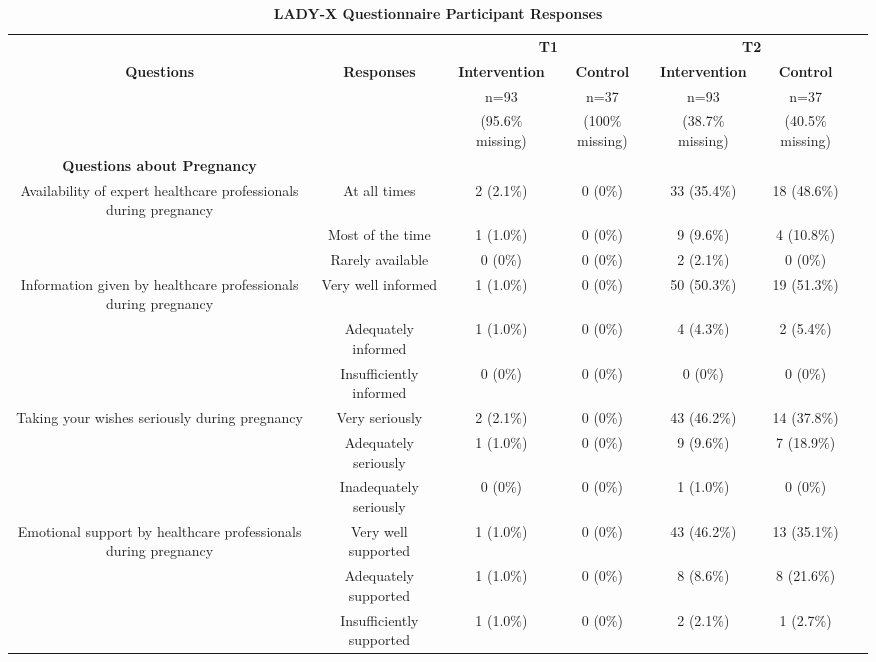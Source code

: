 \documentclass[12pt]{article}
\begin{document}
\begin{landscape}
\centering
\begin{table}[htbp]
    \centering
    \captionsetup{justification=raggedright, singlelinecheck=false, skip=0pt, labelfont=bf}
    \caption{\textbf{LADY-X Questionnaire Participant Responses}}
    \begin{threeparttable}
        \small
        \begin{tabular}{ccccccc}
            \toprule
            & & \multicolumn{2}{c}{\textbf{T1}} & \multicolumn{2}{c}{\textbf{T2}} \\
            \textbf{Questions} & \textbf{Responses} & \textbf{Intervention} & \textbf{Control} & \textbf{Intervention} & \textbf{Control} \\
            & & n=93 & n=37 & n=93 & n=37 \\
            & & (95.6\% missing) & (100\% missing) & (38.7\% missing) & (40.5\% missing) \\
            \midrule
            {\textbf{Questions about Pregnancy}}  \\
            \midrule
            Availability of expert healthcare professionals during pregnancy & At all times & 2 (2.1\%) & 0 (0\%) & 33 (35.4\%) & 18 (48.6\%) \\
             & Most of the time & 1 (1.0\%) & 0 (0\%) & 9 (9.6\%) & 4 (10.8\%) \\
             & Rarely available & 0 (0\%) & 0 (0\%) & 2 (2.1\%) & 0 (0\%) \\
            \midrule
            Information given by healthcare professionals during pregnancy & Very well informed & 1 (1.0\%) & 0 (0\%) & 50 (50.3\%) & 19 (51.3\%) \\
             & Adequately informed & 1 (1.0\%) & 0 (0\%) & 4 (4.3\%) & 2 (5.4\%) \\
             & Insufficiently informed & 0 (0\%) & 0 (0\%) & 0 (0\%) & 0 (0\%) \\
            \midrule
            Taking your wishes seriously during pregnancy & Very seriously & 2 (2.1\%) & 0 (0\%) & 43 (46.2\%) & 14 (37.8\%) \\
             & Adequately seriously & 1 (1.0\%) & 0 (0\%) & 9 (9.6\%) & 7 (18.9\%) \\
             & Inadequately seriously & 0 (0\%) & 0 (0\%) & 1 (1.0\%) & 0 (0\%) \\
            \midrule
            Emotional support by healthcare professionals during pregnancy & Very well supported & 1 (1.0\%) & 0 (0\%) & 43 (46.2\%) & 13 (35.1\%) \\
             & Adequately supported & 1 (1.0\%) & 0 (0\%) & 8 (8.6\%) & 8 (21.6\%) \\
             & Insufficiently supported & 1 (1.0\%) & 0 (0\%) & 2 (2.1\%) & 1 (2.7\%) \\
            \bottomrule
        \end{tabular}
    \end{threeparttable}
\end{table}
\end{landscape}
\end{document}
